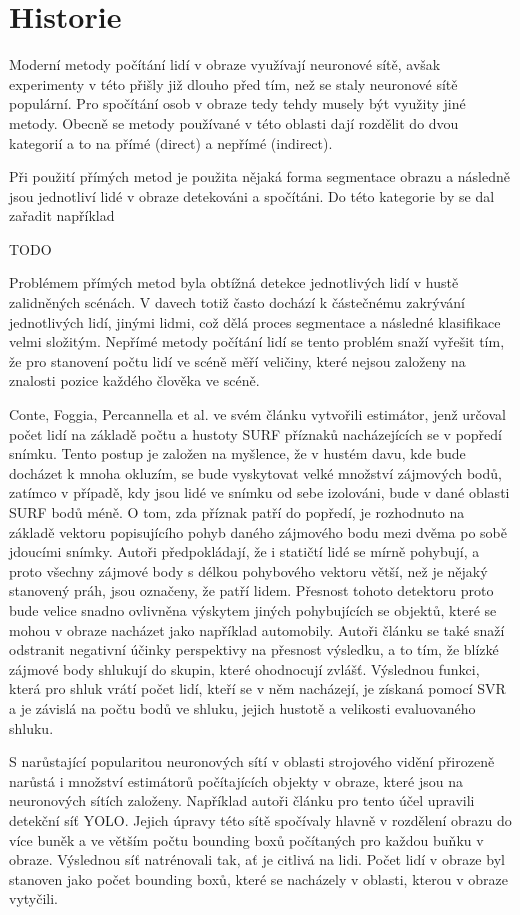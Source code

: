 \chapter{Historie}
\label{sec:History}
Moderní metody počítání lidí v obraze využívají neuronové sítě, avšak experimenty v této přišly již dlouho před tím, než se staly neuronové sítě populární.
Pro spočítání osob v obraze tedy tehdy musely být využity jiné metody.
Obecně se metody používané v této oblasti dají rozdělit do dvou kategorií a to na přímé (direct) a nepřímé (indirect). \cite{crowd_on_pets}

Při použití přímých metod je použita nějaká forma segmentace obrazu a následně jsou jednotliví lidé v obraze detekováni a spočítáni. Do této kategorie by se dal zařadit například 

 TODO

Problémem přímých metod byla obtížná detekce jednotlivých lidí v hustě zalidněných scénách.
V davech totiž často dochází k částečnému zakrývání jednotlivých lidí, jinými lidmi, což dělá proces segmentace a následné klasifikace velmi složitým.
Nepřímé metody počítání lidí se tento problém snaží vyřešit tím, že pro stanovení počtu lidí ve scéně 
měří veličiny, které nejsou založeny na znalosti pozice každého člověka ve scéně.

Conte, Foggia, Percannella et al. ve svém článku \cite{crowd_on_pets} vytvořili estimátor, jenž určoval počet lidí na základě počtu a hustoty SURF příznaků nacházejících se v popředí snímku.
Tento postup je založen na myšlence, že v hustém davu, kde bude docházet k mnoha okluzím, se bude vyskytovat velké množství zájmových bodů, zatímco v případě, kdy jsou lidé ve snímku od sebe izolováni, bude v dané oblasti SURF bodů méně.
O tom, zda příznak patří do popředí, je rozhodnuto na základě vektoru popisujícího pohyb daného zájmového bodu mezi dvěma po sobě jdoucími snímky.
Autoři předpokládají, že i statičtí lidé se mírně pohybují, a proto všechny zájmové body s délkou pohybového vektoru větší, než je nějaký stanovený práh, jsou označeny, že patří lidem.
Přesnost tohoto detektoru proto bude velice snadno ovlivněna výskytem jiných pohybujících se objektů, které se mohou v obraze nacházet jako například automobily.
Autoři článku se také snaží odstranit negativní účinky perspektivy na přesnost výsledku, a to tím, že blízké zájmové body shlukují do skupin, které ohodnocují zvlášť.
Výslednou funkci, která pro shluk vrátí počet lidí, kteří se v něm nacházejí, je získaná pomocí SVR a je závislá na počtu bodů ve shluku, jejich hustotě a velikosti evaluovaného shluku.


S narůstající popularitou neuronových sítí v oblasti strojového vidění přirozeně narůstá i množství estimátorů počítajících objekty v obraze, které jsou na neuronových sítích založeny.
Například autoři článku \cite{YOLO_counting} pro tento účel upravili detekční síť YOLO.
Jejich úpravy této sítě spočívaly hlavně v rozdělení obrazu do více buněk a ve větším počtu bounding boxů počítaných pro každou buňku v obraze. Výslednou síť natrénovali tak, ať je citlivá na lidi.
Počet lidí v obraze byl stanoven jako počet bounding boxů, které se nacházely v oblasti, kterou v obraze vytyčili.






\endinput